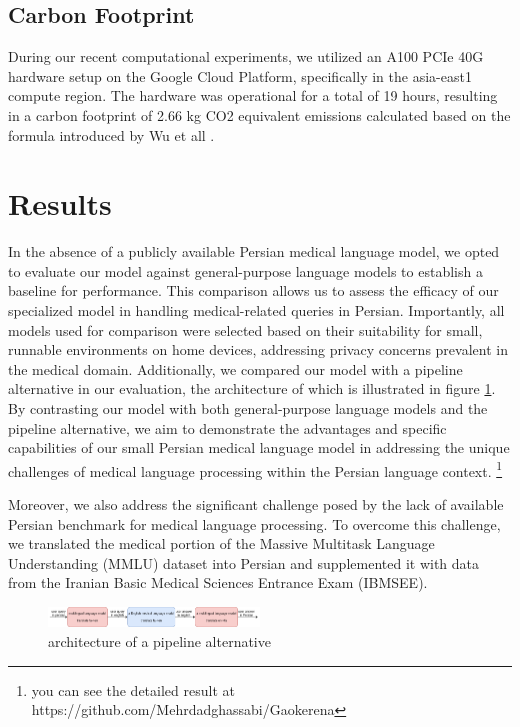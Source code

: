 \documentclass[conference]{IEEEtran}
\begin{document}
\subsection{Carbon Footprint}
During our recent computational experiments, we utilized an A100 PCIe 40G hardware setup on the Google Cloud Platform, specifically in the asia-east1 compute region. The hardware was operational for a total of 19 hours, resulting in a carbon footprint of 2.66 kg CO2 equivalent emissions calculated  based on the formula introduced by Wu et all
\cite{b27}
.
\section{Results}
In the absence of a publicly available Persian medical language model, we opted to evaluate our model against general-purpose language models to establish a baseline for performance. This comparison allows us to assess the efficacy of our specialized model in handling medical-related queries in Persian. Importantly, all models used for comparison were selected based on their suitability for small, runnable environments on home devices, addressing privacy concerns prevalent in the medical domain. Additionally, we compared our model with a pipeline alternative in our evaluation, the architecture of which is illustrated in figure \ref{fig3}. By contrasting our model with both general-purpose language models and the pipeline alternative, we aim to demonstrate the advantages and specific capabilities of our small Persian medical language model in addressing the unique challenges of medical language processing within the Persian language context.
\footnote{
	you can see the detailed result at https://github.com/Mehrdadghassabi/Gaokerena
}

Moreover, we also address the significant challenge posed by the lack of available Persian benchmark for medical language processing. To overcome this challenge, we translated the medical portion of the Massive Multitask Language Understanding (MMLU) dataset 
\cite{b28} 
into Persian and supplemented it with data from the Iranian Basic Medical Sciences Entrance Exam (IBMSEE).

\begin{figure}[htbp]
	\centerline{\includegraphics[width=0.5\textwidth]{fig3.png}}
	\caption{architecture of a pipeline alternative}
	\label{fig3}
\end{figure}
\end{document}
